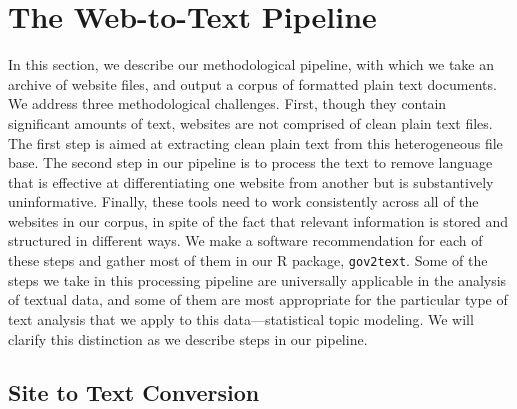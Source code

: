 \documentclass[11pt]{article}
\begin{document}

\vspace{-.2cm}
\section{The Web-to-Text Pipeline} \vspace{-.2cm}
In this section, we describe our methodological pipeline, with which we take an archive of website files, and output a corpus of formatted plain text documents. We address three methodological challenges.  First, though they contain significant amounts of text, websites are not comprised of clean plain text files. The first step is aimed at extracting clean plain text from this heterogeneous file base. The second step in our pipeline is to process the text to remove language that is effective at differentiating one website from another but is substantively uninformative. Finally, these tools need to work consistently across all of the websites in our corpus, in spite of the fact that relevant information is stored and structured in different ways. We make a software recommendation for each of these steps and gather most of them in our R package, \texttt{gov2text}. Some of the steps we take in this processing pipeline are universally applicable in the analysis of textual data, and some of them are most appropriate for the particular type of text analysis that we apply to this data---statistical topic modeling. We will clarify this distinction as we describe steps in our pipeline.

\subsection{Site to Text Conversion}
\end{document}
